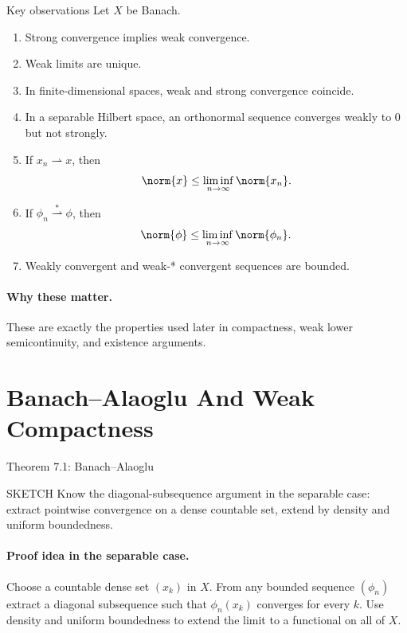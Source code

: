 \documentclass[header={Lecture 4 Exam Study Notes}]{study-note}
\begin{document}
\begin{thmbox}{Key observations}
Let $X$ be Banach.
\begin{enumerate}
\item Strong convergence implies weak convergence.
\item Weak limits are unique.
\item In finite-dimensional spaces, weak and strong convergence coincide.
\item In a separable Hilbert space, an orthonormal sequence converges weakly to $0$ but not strongly.
\item If $x_n\rightharpoonup x$, then
\[
\norm{x}\le \liminf_{n\to\infty}\norm{x_n}.
\]
\item If $\phi_n\overset{*}{\rightharpoonup}\phi$, then
\[
\norm{\phi}\le \liminf_{n\to\infty}\norm{\phi_n}.
\]
\item Weakly convergent and weak-* convergent sequences are bounded.
\end{enumerate}
\end{thmbox}

\paragraph{Why these matter.}
These are exactly the properties used later in compactness, weak lower semicontinuity, and existence arguments.

\section{Banach--Alaoglu And Weak Compactness}

\begin{thmbox}{Theorem 7.1: Banach--Alaoglu}
\thmBanachAlaoglu
\end{thmbox}

\begin{prooflevelbox}{SKETCH}
Know the diagonal-subsequence argument in the separable case: extract pointwise convergence on a dense countable set, extend by density and uniform boundedness.
\end{prooflevelbox}

\paragraph{Proof idea in the separable case.}
Choose a countable dense set $(x_k)$ in $X$. From any bounded sequence $(\phi_n)$ extract a diagonal subsequence such that $\phi_n(x_k)$ converges for every $k$. Use density and uniform boundedness to extend the limit to a functional on all of $X$.
\end{document}
